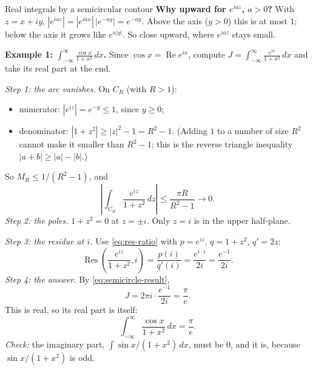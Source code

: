 \documentclass[11pt]{beamer}
\begin{document}
\begin{frame}[allowframebreaks=1.00]{Real integrals by a semicircular contour}
\textbf{Why upward for \(e^{iaz}\), \(a>0\)?} With \(z=x+iy\),
\(|e^{iaz}|=|e^{iax}|\,|e^{-ay}|=e^{-ay}\). Above the axis (\(y>0\)) this is at most \(1\); below the axis it
grows like \(e^{a|y|}\). So close upward, where \(e^{iaz}\) stays small.
\par\framebreak\par
\textbf{Example 1: \(\int_{-\infty}^{\infty}\frac{\cos x}{1+x^2}\,dx\).} Since \(\cos x=\operatorname{Re}e^{ix}\),
compute \(J=\int_{-\infty}^{\infty}\frac{e^{ix}}{1+x^2}\,dx\) and take its real part at the end.

\emph{Step 1: the arc vanishes.} On \(C_R\) (with \(R>1\)):
\begin{itemize}
  \item numerator: \(|e^{iz}|=e^{-y}\le1\), since \(y\ge0\);
  \item denominator: \(|1+z^2|\ge|z|^2-1=R^2-1\). (Adding \(1\) to a number of size \(R^2\) cannot make
        it smaller than \(R^2-1\); this is the reverse triangle inequality \(|a+b|\ge|a|-|b|\).)
\end{itemize}
So \(M_R\le1/(R^2-1)\), and
\[
 \left|\int_{C_R}\frac{e^{iz}}{1+z^2}\,dz\right|
 \le\frac{\pi R}{R^2-1}\longrightarrow0 .
\]
\emph{Step 2: the poles.} \(1+z^2=0\) at \(z=\pm i\). Only \(z=i\) is in the upper half-plane.
\par\framebreak\par
\emph{Step 3: the residue at \(i\).} Use \eqref{eq:res-ratio} with \(p=e^{iz}\), \(q=1+z^2\), \(q'=2z\):
\[
 \operatorname{Res}\left(\frac{e^{iz}}{1+z^2},i\right)=\frac{p(i)}{q'(i)}=\frac{e^{i\cdot i}}{2i}=\frac{e^{-1}}{2i}.
\]
\emph{Step 4: the answer.} By \eqref{eq:semicircle-result},
\[
 J=2\pi i\cdot\frac{e^{-1}}{2i}=\frac{\pi}{e}.
\]
This is real, so its real part is itself:
\begin{equation}
 \int_{-\infty}^{\infty}\frac{\cos x}{1+x^2}\,dx=\frac{\pi}{e}.
 \label{eq:cos-rational-integral}
\end{equation}
\emph{Check:} the imaginary part, \(\int\sin x/(1+x^2)\,dx\), must be \(0\), and it is, because
\(\sin x/(1+x^2)\) is odd.
\end{frame}
\end{document}
